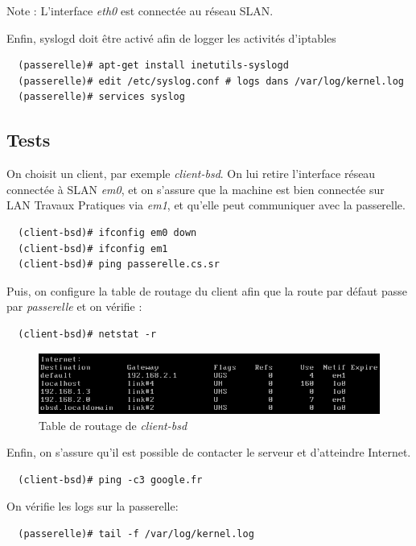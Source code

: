 \documentclass[a4paper]{article}
\begin{document}
Note : L'interface \textit{eth0} est connectée au réseau SLAN.

\vspace{1\baselineskip}
Enfin, syslogd doit être activé afin de logger les activités d'iptables

\begin{verbatim}
  (passerelle)# apt-get install inetutils-syslogd
  (passerelle)# edit /etc/syslog.conf # logs dans /var/log/kernel.log
  (passerelle)# services syslog
\end{verbatim}

\subsection{Tests}
On choisit un client, par exemple \textit{client-bsd}. On lui
retire l'interface réseau connectée à SLAN \textit{em0}, et on s'assure que
la machine est bien connectée sur LAN Travaux Pratiques via \textit{em1}, et
qu'elle peut communiquer avec la passerelle. 
\begin{verbatim}
  (client-bsd)# ifconfig em0 down
  (client-bsd)# ifconfig em1
  (client-bsd)# ping passerelle.cs.sr
\end{verbatim}

\vspace{1\baselineskip}
Puis, on configure la table de routage du client afin
que la route par défaut passe par \textit{passerelle} et on vérifie :
\begin{verbatim}
  (client-bsd)# netstat -r
\end{verbatim}
\begin{figure}[!ht]
	\centering
	\includegraphics[scale=.5]{Internet.png}
	\caption{\label{routes} Table de routage de \textit{client-bsd}}
\end{figure}

\vspace{1\baselineskip}
Enfin, on s'assure qu'il est possible de contacter le serveur
 et d'atteindre Internet.
\begin{verbatim}
  (client-bsd)# ping -c3 google.fr
\end{verbatim}

\vspace{1\baselineskip}
On vérifie les logs sur la passerelle:
\begin{verbatim}
  (passerelle)# tail -f /var/log/kernel.log
\end{verbatim}
\end{document}
